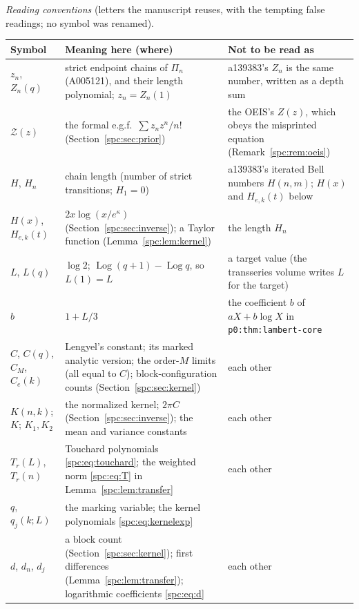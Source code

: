 \documentclass[11pt,letterpaper]{article}
\theoremstyle{definition}\newtheorem{definition}[theorem]{Definition}
\theoremstyle{remark}\newtheorem{remark}[theorem]{Remark}
\newcommand{\Log}{\operatorname{Log}}
\newcommand{\file}[1]{\nolinkurl{#1}}
\begin{document}
\medskip\noindent\begin{minipage}{\textwidth}
\emph{Reading conventions} (letters the manuscript reuses, with the tempting
false readings; no symbol was renamed).

\smallskip
\begingroup\small\renewcommand{\arraystretch}{1.1}
\noindent\begin{tabular}{@{}>{\raggedright\arraybackslash}p{0.8in}>{\raggedright\arraybackslash}p{3.4in}>{\raggedright\arraybackslash}p{1.95in}@{}}
\toprule
Symbol & Meaning here (where) & Not to be read as\\
\midrule
$z_n$, $Z_n(q)$ & strict endpoint chains of $\Pi_n$ (A005121), and their
 length polynomial; $z_n=Z_n(1)$ & a139383's $Z_n$ is the same number,
 written as a depth sum\\
$\mathcal Z(z)$ & the formal e.g.f.\ $\sum z_nz^n/n!$ (Section~\ref{spc:sec:prior}) &
 the OEIS's $Z(z)$, which obeys the misprinted equation
 (Remark~\ref{spc:rem:oeis})\\
$H$, $H_n$ & chain length (number of strict transitions; $H_1=0$) &
 a139383's iterated Bell numbers $H(n,m)$; $H(x)$ and $H_{e,k}(t)$ below\\
$H(x)$, $H_{e,k}(t)$ & $2x\log(x/e^\kappa)$ (Section~\ref{spc:sec:inverse});
 a Taylor function (Lemma~\ref{spc:lem:kernel}) & the length $H_n$\\
$L$, $L(q)$ & $\log2$; $\Log(q+1)-\Log q$, so $L(1)=L$ & a target value
 (the transseries volume writes $L$ for the target)\\
$b$ & $1+L/3$ & the coefficient $b$ of $aX+b\log X$ in
 \file{p0:thm:lambert-core}\\
$C$, $C(q)$, $C_M$, $C_e(k)$ & Lengyel's constant; its marked analytic
 version; the order-$M$ limits (all equal to $C$); block-configuration counts
 (Section~\ref{spc:sec:kernel}) & each other\\
$K(n,k)$; $K$; $K_1,K_2$ & the normalized kernel; $2\pi C$
 (Section~\ref{spc:sec:inverse}); the mean and variance constants & each
 other\\
$T_r(L)$, $T_r(n)$ & Touchard polynomials \eqref{spc:eq:touchard}; the
 weighted norm \eqref{spc:eq:T} in Lemma~\ref{spc:lem:transfer} & each other\\
$q$, $q_j(k;L)$ & the marking variable; the kernel polynomials
 \eqref{spc:eq:kernelexp} & \\
$d$, $d_n$, $d_j$ & a block count (Section~\ref{spc:sec:kernel}); first
 differences (Lemma~\ref{spc:lem:transfer}); logarithmic coefficients
 \eqref{spc:eq:d} & each other\\

\end{tabular}
\end{minipage}
\end{document}

